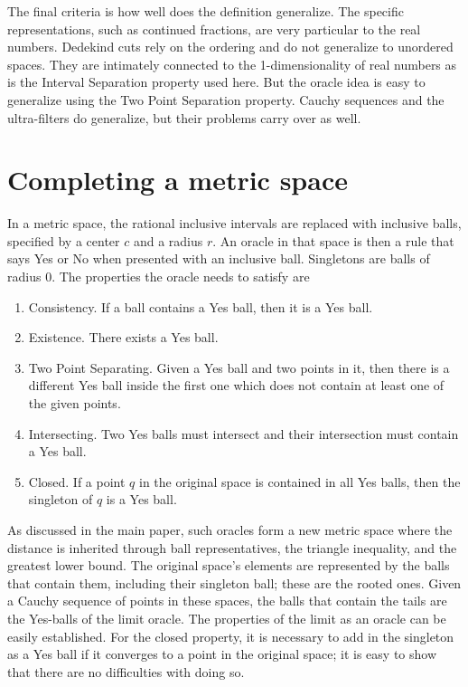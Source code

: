 \documentclass[12pt]{article}
\theoremstyle{remark}
\begin{document}
The final criteria is how well does the definition generalize. The specific representations, such as continued fractions, are very particular to the real numbers. Dedekind cuts rely on the ordering and do not generalize to unordered spaces. They are intimately connected to the 1-dimensionality of real numbers as is the Interval Separation property used here. But the oracle idea is easy to generalize using the Two Point Separation property. Cauchy sequences and the ultra-filters do generalize, but their problems carry over as well. 

\section{Completing a metric space}

In a metric space, the rational inclusive intervals are replaced with inclusive balls, specified by a center $c$ and a radius $r$. An oracle in that space is then a rule that says Yes or No when presented with an inclusive ball. Singletons are balls of radius $0$. The properties the oracle needs to satisfy are
\begin{enumerate}
    \item Consistency. If a ball contains a Yes ball, then it is a Yes ball. 
    \item Existence. There exists a Yes ball.
    \item Two Point Separating. Given a Yes ball and two points in it, then there is a different Yes ball inside the first one which does not contain at least one of the given points. 
    \item Intersecting. Two Yes balls must intersect and their intersection must contain a Yes ball.
    \item Closed. If a point $q$ in the original space is contained in all Yes balls, then the singleton of $q$ is a Yes ball.
\end{enumerate}

As discussed in the main paper, such oracles form a new metric space where the distance is inherited through ball representatives, the triangle inequality, and the greatest lower bound. The original space's elements are represented by the balls that contain them, including their singleton ball; these are the rooted ones. Given a Cauchy sequence of points in these spaces, the balls that contain the tails are the Yes-balls of the limit oracle. The properties of the limit as an oracle can be easily established. For the closed property, it is necessary to add in the singleton as a Yes ball if it converges to a point in the original space; it is easy to show that there are no difficulties with doing so. 
\end{document}
